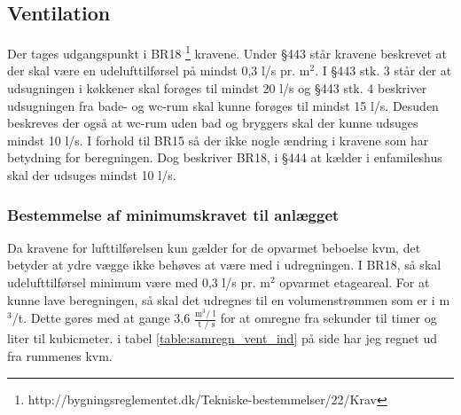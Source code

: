 \subsection{Ventilation} \label{sub:ventilation}
Der tages udgangspunkt i BR18 \footnote{http://bygningsreglementet.dk/Tekniske-bestemmelser/22/Krav} kravene.
Under \S443 står kravene beskrevet at der skal være en udelufttilførsel på mindst 0,3 l/s pr. m$^2$.
I \S443 stk. 3 står der at udsugningen i køkkener skal forøges til mindst 20 l/s og \S443 stk. 4 beskriver udsugningen fra bade- og wc-rum skal kunne forøges til mindst 15 l/s.
Desuden beskreves der også at wc-rum uden bad og bryggers skal der kunne udsuges mindst 10 l/s. 
I forhold til BR15 så der ikke nogle ændring i kravene som har betydning for beregningen.
Dog beskriver BR18, i \S444 at kælder i enfamileshus skal der udsuges mindst 10 l/s.

\subsubsection{Bestemmelse af minimumskravet til anlægget} \label{subsub:minimumkrav_ventilation}
Da kravene for lufttilførelsen kun gælder for de opvarmet beboelse kvm,
det betyder at ydre vægge ikke behøves at være med i udregningen.
I BR18, %
så skal udelufttilførsel minimum være med 0,3 l/s pr. m$^2$ opvarmet etageareal.
For at kunne lave beregningen, så skal det udregnes til en volumenstrømmen som er i m$^3$/t. 
Dette gøres med at gange 3,6 $\frac{ \text{m}^3 \text{/ l} }{\text{ t / s} }$ for at omregne fra sekunder til timer og liter til kubicmeter.
i tabel \ref{table:samregn_vent_ind} på side \pageref{table:samregn_vent_ind} har jeg regnet ud fra rummenes kvm.

